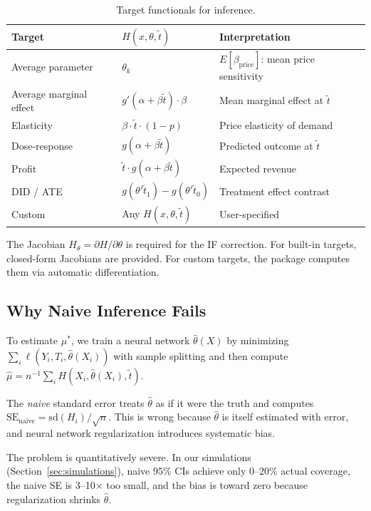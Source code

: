 \begin{table}[ht]
\centering
\caption{Target functionals for inference.}\label{tab:targets}
\begin{tabular}{lll}
\toprule
\textbf{Target} & $H(x, \theta, \tilde{t})$ & \textbf{Interpretation} \\
\midrule
Average parameter  & $\theta_k$                            & $E[\beta_{\text{price}}]$: mean price sensitivity \\
Average marginal effect & $g'(\alpha + \beta \tilde{t}) \cdot \beta$ & Mean marginal effect at $\tilde{t}$ \\
Elasticity         & $\beta \cdot \tilde{t} \cdot (1-p)$    & Price elasticity of demand \\
Dose-response      & $g(\alpha + \beta \tilde{t})$          & Predicted outcome at $\tilde{t}$ \\
Profit             & $\tilde{t} \cdot g(\alpha + \beta \tilde{t})$ & Expected revenue \\
DID / ATE          & $g(\theta'\tilde{t}_1) - g(\theta'\tilde{t}_0)$ & Treatment effect contrast \\
Custom             & Any $H(x, \theta, \tilde{t})$          & User-specified \\
\bottomrule
\end{tabular}
\end{table}

The Jacobian $H_\theta = \partial H / \partial \theta$ is required for the IF correction. For built-in targets, closed-form Jacobians are provided. For custom targets, the package computes them via automatic differentiation.

\subsection{Why Naive Inference Fails}\label{sec:naive_fails}

To estimate $\mu^*$, we train a neural network $\hat{\theta}(X)$ by minimizing $\sum_i \ell(Y_i, T_i, \hat{\theta}(X_i))$ with sample splitting and then compute $\hat{\mu} = n^{-1}\sum_i H(X_i, \hat{\theta}(X_i), \tilde{t})$.

The \emph{naive} standard error treats $\hat{\theta}$ as if it were the truth and computes $\text{SE}_{\text{naive}} = \text{sd}(H_i) / \sqrt{n}$. This is wrong because $\hat{\theta}$ is itself estimated with error, and neural network regularization introduces systematic bias.

The problem is quantitatively severe. In our simulations (Section~\ref{sec:simulations}), naive 95\% CIs achieve only 0--20\% actual coverage, the naive SE is 3--10$\times$ too small, and the bias is toward zero because regularization shrinks $\hat{\theta}$.

